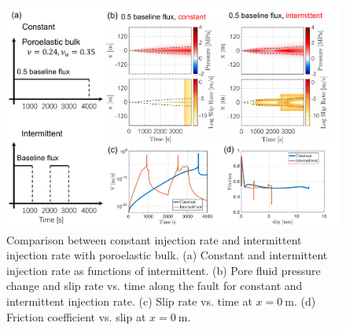 \begin{figure}[htbp]
    \centering
    \includegraphics[width=1.0\textwidth]{figures/ConstIntermittent.pdf}
    \caption{Comparison between constant injection rate and intermittent injection rate with poroelastic bulk. 
    (a) Constant and intermittent injection rate as functions of intermittent. 
    (b) Pore fluid pressure change and slip rate vs. time along the fault for constant and intermittent injection rate.
    (c) Slip rate vs. time at $x = 0\ \mathrm{m}$. 
    (d) Friction coefficient vs. slip at $x = 0\ \mathrm{m}$.}
    \label{fig:constIntermittent}
\end{figure}